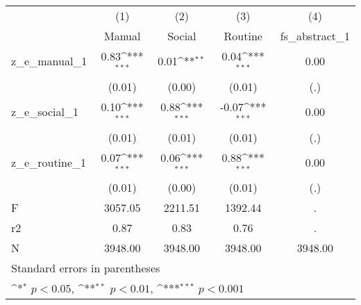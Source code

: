 {
\def\sym#1{\ifmmode^{#1}\else\(^{#1}\)\fi}
\begin{tabular}{l*{4}{c}}
\toprule
            &\multicolumn{1}{c}{(1)}&\multicolumn{1}{c}{(2)}&\multicolumn{1}{c}{(3)}&\multicolumn{1}{c}{(4)}\\
            &\multicolumn{1}{c}{Manual}&\multicolumn{1}{c}{Social}&\multicolumn{1}{c}{Routine}&\multicolumn{1}{c}{fs\_abstract\_1}\\
\midrule
z\_e\_manual\_1&        0.83\sym{***}&        0.01\sym{**} &        0.04\sym{***}&        0.00         \\
            &      (0.01)         &      (0.00)         &      (0.01)         &         (.)         \\
\addlinespace
z\_e\_social\_1&        0.10\sym{***}&        0.88\sym{***}&       -0.07\sym{***}&        0.00         \\
            &      (0.01)         &      (0.01)         &      (0.01)         &         (.)         \\
\addlinespace
z\_e\_routine\_1&        0.07\sym{***}&        0.06\sym{***}&        0.88\sym{***}&        0.00         \\
            &      (0.01)         &      (0.00)         &      (0.01)         &         (.)         \\
\midrule
F           &     3057.05         &     2211.51         &     1392.44         &           .         \\
r2          &        0.87         &        0.83         &        0.76         &           .         \\
N           &     3948.00         &     3948.00         &     3948.00         &     3948.00         \\
\bottomrule
\multicolumn{5}{l}{\footnotesize Standard errors in parentheses}\\
\multicolumn{5}{l}{\footnotesize \sym{*} \(p<0.05\), \sym{**} \(p<0.01\), \sym{***} \(p<0.001\)}\\
\end{tabular}
}

